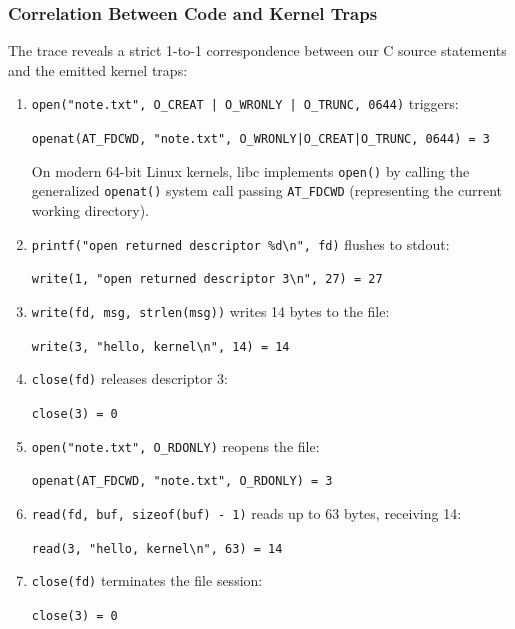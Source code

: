 \documentclass{labreport}
\begin{document}
\subsubsection{Correlation Between Code and Kernel Traps}
The trace reveals a strict 1-to-1 correspondence between our C source statements and the emitted kernel traps:
\begin{enumerate}
    \item \texttt{open("note.txt", O\_CREAT | O\_WRONLY | O\_TRUNC, 0644)} triggers:
    \begin{center}
        \texttt{openat(AT\_FDCWD, "note.txt", O\_WRONLY|O\_CREAT|O\_TRUNC, 0644) = 3}
    \end{center}
    On modern 64-bit Linux kernels, libc implements \texttt{open()} by calling the generalized \texttt{openat()} system call passing \texttt{AT\_FDCWD} (representing the current working directory).
    \item \texttt{printf("open returned descriptor \%d\textbackslash n", fd)} flushes to stdout:
    \begin{center}
        \texttt{write(1, "open returned descriptor 3\textbackslash n", 27) = 27}
    \end{center}
    \item \texttt{write(fd, msg, strlen(msg))} writes 14 bytes to the file:
    \begin{center}
        \texttt{write(3, "hello, kernel\textbackslash n", 14) = 14}
    \end{center}
    \item \texttt{close(fd)} releases descriptor 3:
    \begin{center}
        \texttt{close(3) = 0}
    \end{center}
    \item \texttt{open("note.txt", O\_RDONLY)} reopens the file:
    \begin{center}
        \texttt{openat(AT\_FDCWD, "note.txt", O\_RDONLY) = 3}
    \end{center}
    \item \texttt{read(fd, buf, sizeof(buf) - 1)} reads up to 63 bytes, receiving 14:
    \begin{center}
        \texttt{read(3, "hello, kernel\textbackslash n", 63) = 14}
    \end{center}
    \item \texttt{close(fd)} terminates the file session:
    \begin{center}
        \texttt{close(3) = 0}
    \end{center}
\end{enumerate}
\end{document}
